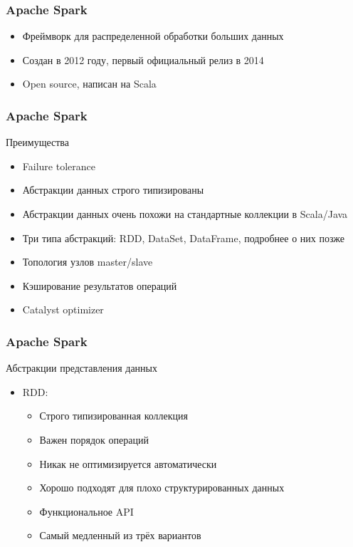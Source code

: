 \documentclass{beamer}
\begin{document}
\begin{frame}\frametitle{Apache Spark}
\begin{itemize}
    \item Фреймворк для распределенной обработки больших данных
    \item Создан в 2012 году, первый официальный релиз в 2014
    \item Open source, написан на Scala
\end{itemize}
\end{frame}

\begin{frame}\frametitle{Apache Spark}
Преимущества
\begin{itemize}
    \item Failure tolerance
    \item Абстракции данных строго типизированы
    \item Абстракции данных очень похожи на стандартные коллекции в Scala/Java
    \item Три типа абстракций: RDD, DataSet, DataFrame, подробнее о них позже
    \item Топология узлов master/slave
    \item Кэширование результатов операций
    \item Catalyst optimizer
\end{itemize}
\end{frame}

\begin{frame}\frametitle{Apache Spark}
Абстракции представления данных
\begin{itemize}
    \item RDD: 
    \begin{itemize}
        \item Строго типизированная коллекция
        \item Важен порядок операций
        \item Никак не оптимизируется автоматически
        \item Хорошо подходят для плохо структурированных данных
        \item Функциональное API
        \item Самый медленный из трёх вариантов
    \end{itemize}
\end{itemize}
\end{frame}
\end{document}
